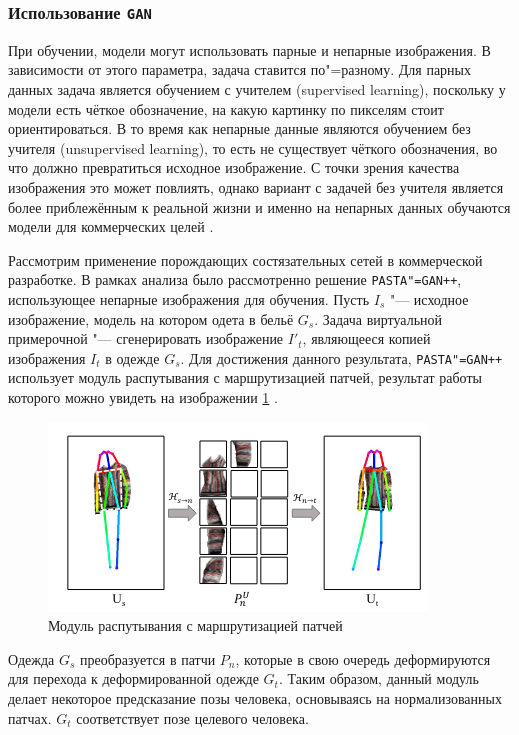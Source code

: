 \subsubsection{Использование \texttt{GAN}}
При обучении, модели могут использовать парные и непарные изображения. В зависимости от этого параметра, задача ставится по"=разному. Для парных данных задача является обучением с учителем (supervised learning), поскольку у модели есть чёткое обозначение, на какую картинку по пикселям стоит ориентироваться. В то время как непарные данные являются обучением без учителя (unsupervised learning), то есть не существует чёткого обозначения, во что должно превратиться исходное изображение. С точки зрения качества изображения это может повлиять, однако вариант с задачей без учителя является более приблежённым к реальной жизни и именно на непарных данных обучаются модели для коммерческих целей \cite{unpaired}.

Рассмотрим применение порождающих состязательных сетей в коммерческой разработке. В рамках анализа было рассмотренно решение \texttt{PASTA"=GAN++}, использующее непарные изображения для обучения. Пусть $I_s$ "--- исходное изображение, модель на котором одета в бельё $G_s$. Задача виртуальной примерочной "--- сгенерировать изображение $I'_t$, являющееся копией изображения $I_t$ в одежде $G_s$. Для достижения данного результата, \texttt{PASTA"=GAN++} использует модуль распутывания с маршрутизацией патчей, результат работы которого можно увидеть на изображении \ref{fig:gan_prdm} \cite{pasta_gan}.
\begin{figure}[H]
    \centering
    \includegraphics[width=0.6\linewidth]{images/gan_prdm_res.png}
    \caption{Модуль распутывания с маршрутизацией патчей}
    \label{fig:gan_prdm}
\end{figure}

Одежда $G_s$ преобразуется в патчи $P_n$, которые в свою очередь деформируются для перехода к деформированной одежде $G_t$. Таким образом, данный модуль делает некоторое предсказание позы человека, основываясь на нормализованных патчах. $G_t$ соответствует позе целевого человека.

